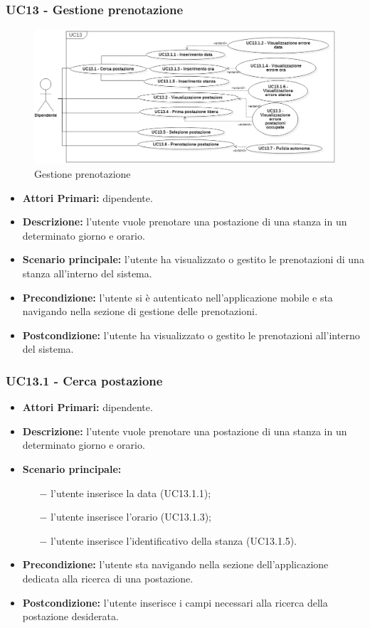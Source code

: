 \subsubsection{ UC13 - Gestione prenotazione }
\begin{figure}[H]
	\centering
	\includegraphics[width=18cm]{res/images/UC13.png}
	\caption{Gestione prenotazione}
	\label{fig:Gestione prenotazione}
\end{figure}
\begin{itemize}
	\item\textbf{Attori Primari:} dipendente.
	\item\textbf{Descrizione:} l’utente vuole prenotare una postazione di una stanza in un determinato giorno e orario.
	\item\textbf{Scenario principale:} l’utente ha visualizzato o gestito le prenotazioni di una stanza all’interno del sistema.
	\item\textbf{Precondizione:} l’utente si è autenticato nell'applicazione mobile e sta navigando nella sezione di gestione delle prenotazioni.
	\item\textbf{Postcondizione:} l’utente ha visualizzato o gestito le prenotazioni all’interno del sistema.
\end{itemize}
\subsubsection{ UC13.1 - Cerca postazione}
\begin{itemize}
	\item\textbf{Attori Primari:} dipendente.
	\item\textbf{Descrizione:} l’utente vuole prenotare una postazione di una stanza in un determinato giorno e orario.
	\item\textbf{Scenario principale:} 
	\begin{itemize}
		\item[$-$] l’utente inserisce la data (UC13.1.1);
		\item[$-$] l’utente inserisce l'orario (UC13.1.3);
		\item[$-$] l’utente inserisce l'identificativo della stanza (UC13.1.5).
	\end{itemize}
	\item\textbf{Precondizione:} l’utente sta navigando nella sezione dell'applicazione dedicata alla ricerca di una postazione.
	\item\textbf{Postcondizione:} l’utente inserisce i campi necessari alla ricerca della postazione desiderata.
\end{itemize}
